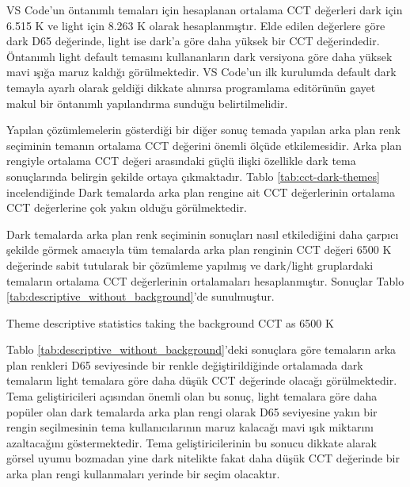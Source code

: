 \documentclass{article}
\begin{document}
VS Code'un öntanımlı temaları için hesaplanan ortalama CCT değerleri dark için 6.515 K ve light için 8.263 K olarak
hesaplanmıştır. Elde edilen değerlere göre dark D65 değerinde, light ise dark'a göre daha yüksek bir CCT değerindedir.
Öntanımlı light default temasını kullananların dark versiyona göre daha yüksek mavi ışığa maruz kaldığı görülmektedir.
VS Code'un ilk kurulumda default dark temayla ayarlı olarak geldiği dikkate alınırsa programlama editörünün gayet makul
bir öntanımlı yapılandırma sunduğu belirtilmelidir.

Yapılan çözümlemelerin gösterdiği bir diğer sonuç temada yapılan arka plan renk seçiminin temanın ortalama CCT değerini
önemli ölçüde etkilemesidir. Arka plan rengiyle ortalama CCT değeri arasındaki güçlü ilişki özellikle dark tema
sonuçlarında belirgin şekilde ortaya çıkmaktadır.  Tablo \ref{tab:cct-dark-themes} incelendiğinde Dark temalarda arka
plan rengine ait CCT değerlerinin ortalama CCT değerlerine çok yakın olduğu görülmektedir.

Dark temalarda arka plan renk seçiminin sonuçları nasıl etkilediğini daha çarpıcı şekilde görmek amacıyla tüm temalarda
arka plan renginin CCT değeri 6500 K değerinde sabit tutularak bir çözümleme yapılmış ve dark/light gruplardaki
temaların ortalama CCT değerlerinin ortalamaları hesaplanmıştır.  Sonuçlar Tablo
\ref{tab:descriptive_without_background}'de sunulmuştur.

\begin{table}[H]

	\caption{Theme descriptive statistics taking the background CCT as 6500 K}
	\label{tab:descriptive_without_background}
\end{table}

Tablo \ref{tab:descriptive_without_background}'deki sonuçlara göre temaların arka plan renkleri D65 seviyesinde bir
renkle değiştirildiğinde ortalamada dark temaların light temalara göre daha düşük CCT değerinde olacağı görülmektedir.
Tema geliştiricileri açısından önemli olan bu sonuç, light temalara göre daha popüler olan dark temalarda arka plan
rengi olarak D65 seviyesine yakın bir rengin seçilmesinin tema kullanıcılarının maruz kalacağı mavi ışık miktarını
azaltacağını göstermektedir.  Tema geliştiricilerinin bu sonucu dikkate alarak görsel uyumu bozmadan yine dark nitelikte fakat
daha düşük CCT değerinde bir arka plan rengi kullanmaları yerinde bir seçim olacaktır.
\end{document}
